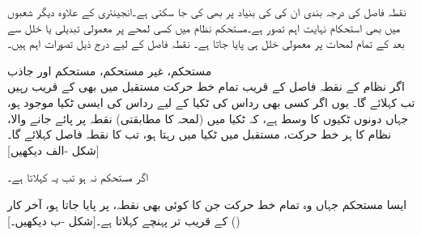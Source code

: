 نقطہ فاصل کی درجہ بندی ان کی  کی بنیاد پر بھی کی جا سکتی ہے۔انجینئری کے علاوہ دیگر شعبوں میں بھی  استحکام نہایت اہم تصور ہے۔مستحکم نظام میں کسی لمحے پر معمولی تبدیلی یا خلل سے بعد کے تمام لمحات پر معمولی خلل ہی پایا جاتا ہے۔ نقطہ فاصل کے لیے درج ذیل تصورات اہم ہیں۔

\quad مستحکم، غیر مستحکم، مستحکم اور جاذب\\
اگر نظام  کے نقطہ فاصل  کے قریب تمام خط حرکت مستقبل میں بھی  کے قریب رہیں تب    کہلائے گا۔ یوں اگر کسی بھی رداس  کی ٹکیا  کے لیے  رداس  کی ایسی ٹکیا  موجود ہو،  جہاں دونوں ٹکیوں کا وسط  ہے، کہ  ٹکیا  میں (لمحہ  کا مطابقتی) نقطہ  پر  پائے جانے والا، نظام  کا ہر خط حرکت، مستقبل میں ٹکیا  میں رہتا ہو، تب  کا نقطہ فاصل  کہلائے گا۔[شکل -الف دیکھیں]

اگر  مستحکم نہ ہو تب یہ  کہلاتا ہے۔ 

ایسا مستحکم  جہاں وہ تمام خط حرکت جن کا کوئی بھی نقطہ،  پر پایا جاتا ہو، آخر کار ()  کے قریب تر پہنچے   کہلاتا ہے۔[شکل -ب دیکھیں۔]

